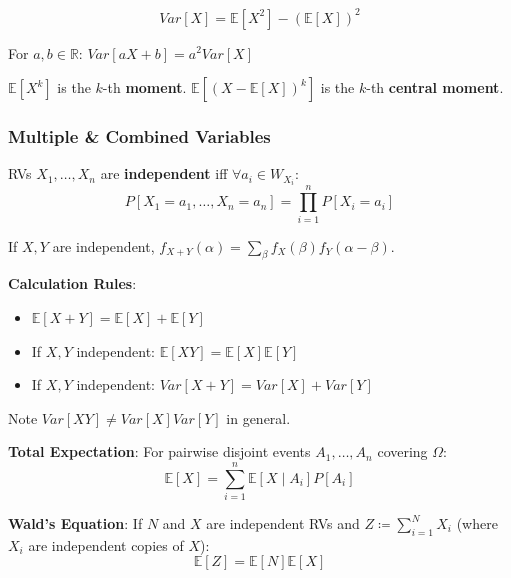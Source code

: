 \begin{theorem}
	$$Var[X] = \mathbb{E}[X^2] - (\mathbb{E}[X])^2$$
\end{theorem}

\begin{lemma}
	For $a, b \in \mathbb{R}$: $Var[aX+b] = a^2 Var[X]$
\end{lemma}

\begin{definition}
	$\mathbb{E}[X^k]$ is the $k$-th \textbf{moment}. $\mathbb{E}[(X-\mathbb{E}[X])^k]$ is the $k$-th \textbf{central moment}.
\end{definition}

\subsubsection{Multiple \& Combined Variables}

\begin{definition}
	RVs $X_1, \dots, X_n$ are \textbf{independent} iff $\forall a_i \in W_{X_i}$:
	$$P[X_1=a_1, \dots, X_n=a_n] = \prod_{i=1}^n P[X_i=a_i]$$
\end{definition}

\begin{theorem}
	If $X, Y$ are independent, $f_{X+Y}(\alpha) = \sum_{\beta} f_X(\beta) f_Y(\alpha-\beta)$.
\end{theorem}

\begin{remark}
	\textbf{Calculation Rules}:
	\begin{itemize}
		\item $\mathbb{E}[X+Y] = \mathbb{E}[X] + \mathbb{E}[Y]$
		\item If $X, Y$ independent: $\mathbb{E}[XY] = \mathbb{E}[X] \mathbb{E}[Y]$
		\item If $X, Y$ independent: $Var[X+Y] = Var[X] + Var[Y]$
	\end{itemize}
	Note $Var[XY] \neq Var[X]Var[Y]$ in general.
\end{remark}

\begin{theorem}
	\textbf{Total Expectation}: For pairwise disjoint events $A_1, \dots, A_n$ covering $\Omega$:
	$$\mathbb{E}[X] = \sum_{i=1}^n \mathbb{E}[X \mid A_i] P[A_i]$$
\end{theorem}

\begin{theorem}
	\textbf{Wald's Equation}: If $N$ and $X$ are independent RVs and $Z \coloneqq \sum_{i=1}^N X_i$ (where $X_i$ are independent copies of $X$):
	$$\mathbb{E}[Z] = \mathbb{E}[N] \mathbb{E}[X]$$
\end{theorem}

